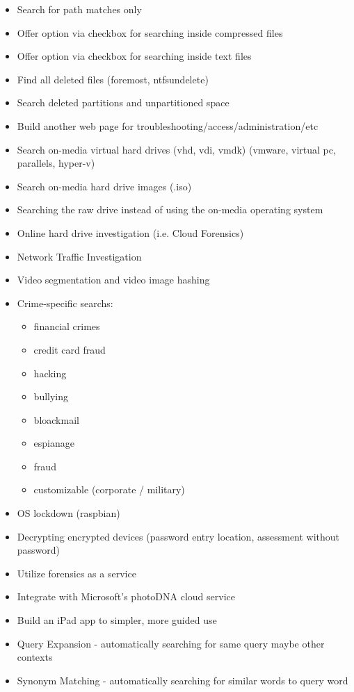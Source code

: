 \documentclass[12pt]{article}
\begin{document}
\begin{itemize}
  \item Search for path matches only
  \item Offer option via checkbox for searching inside compressed files
  \item Offer option via checkbox for searching inside text files
  \item Find all deleted files (foremost, ntfsundelete)
  \item Search deleted partitions and unpartitioned space
  \item Build another web page for troubleshooting/access/administration/etc
  \item Search on-media virtual hard drives (vhd, vdi, vmdk) (vmware, virtual pc, parallels, hyper-v)
  \item Search on-media hard drive images (.iso)
  \item Searching the raw drive instead of using the on-media operating system
  \item Online hard drive investigation (i.e. Cloud Forensics)
  \item Network Traffic Investigation
  \item Video segmentation and video image hashing
  \item Crime-specific searchs:
  \begin{itemize}
    \item financial crimes
    \item credit card fraud
    \item hacking
    \item bullying
    \item bloackmail
    \item espianage
    \item fraud
    \item customizable (corporate / military)
  \end{itemize}
  \item OS lockdown (raspbian)
  \item Decrypting encrypted devices (password entry location, assessment without password)
  \item Utilize forensics as a service
  \item Integrate with Microsoft's photoDNA cloud service
  \item Build an iPad app to simpler, more guided use
  \item Query Expansion - automatically searching for same query maybe other contexts
  \item Synonym Matching - automatically searching for similar words to query word

\end{itemize}
\end{document}
